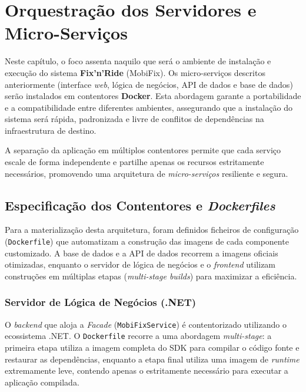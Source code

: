 \documentclass[a4paper,12pt]{scrreprt}
\begin{document}
\chapter{Orquestração dos Servidores e Micro-Serviços}

Neste capítulo, o foco assenta naquilo que será o ambiente de instalação e execução do sistema \textbf{Fix'n'Ride} (MobiFix). Os micro-serviços descritos anteriormente (interface \textit{web}, lógica de negócios, API de dados e base de dados) serão instalados em contentores \textbf{Docker}. Esta abordagem garante a portabilidade e a compatibilidade entre diferentes ambientes, assegurando que a instalação do sistema será rápida, padronizada e livre de conflitos de dependências na infraestrutura de destino.

A separação da aplicação em múltiplos contentores permite que cada serviço escale de forma independente e partilhe apenas os recursos estritamente necessários, promovendo uma arquitetura de \textit{micro-serviços} resiliente e segura.

\section{Especificação dos Contentores e \textit{Dockerfiles}}

Para a materialização desta arquitetura, foram definidos ficheiros de configuração (\texttt{Dockerfile}) que automatizam a construção das imagens de cada componente customizado. A base de dados e a API de dados recorrem a imagens oficiais otimizadas, enquanto o servidor de lógica de negócios e o \textit{frontend} utilizam construções em múltiplas etapas (\textit{multi-stage builds}) para maximizar a eficiência.

\subsection{Servidor de Lógica de Negócios (.NET)}
O \textit{backend} que aloja a \textit{Facade} (\texttt{MobiFixService}) é contentorizado utilizando o ecossistema .NET. O \texttt{Dockerfile} recorre a uma abordagem \textit{multi-stage}: a primeira etapa utiliza a imagem completa do SDK para compilar o código fonte e restaurar as dependências, enquanto a etapa final utiliza uma imagem de \textit{runtime} extremamente leve, contendo apenas o estritamente necessário para executar a aplicação compilada.
\end{document}
